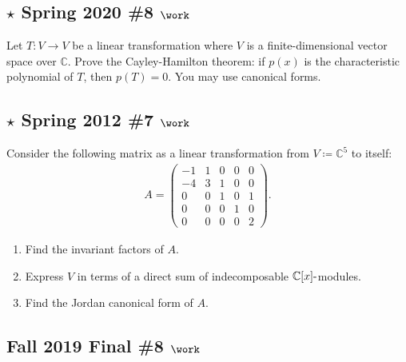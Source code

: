 \hypertarget{star-spring-2020-8-work}{%
\subsection{\texorpdfstring{\(\star\) Spring 2020 \#8
\(\work\)}{\textbackslash star Spring 2020 \#8 \textbackslash work}}\label{star-spring-2020-8-work}}

Let \(T:V\to V\) be a linear transformation where \(V\) is a
finite-dimensional vector space over \({\mathbb{C}}\). Prove the
Cayley-Hamilton theorem: if \(p(x)\) is the characteristic polynomial of
\(T\), then \(p(T) = 0\). You may use canonical forms.

\hypertarget{star-spring-2012-7-work}{%
\subsection{\texorpdfstring{\(\star\) Spring 2012 \#7
\(\work\)}{\textbackslash star Spring 2012 \#7 \textbackslash work}}\label{star-spring-2012-7-work}}

Consider the following matrix as a linear transformation from
\(V\coloneqq{\mathbb{C}}^5\) to itself:
\begin{align*}
A=\left(\begin{array}{ccccc}
-1 & 1 & 0 & 0 & 0 \\
-4 & 3 & 1 & 0 & 0 \\
0 & 0 & 1 & 0 & 1 \\
0 & 0 & 0 & 1 & 0 \\
0 & 0 & 0 & 0 & 2
\end{array}\right)
.\end{align*}

\begin{enumerate}
\def\labelenumi{\alph{enumi}.}
\item
  Find the invariant factors of \(A\).
\item
  Express \(V\) in terms of a direct sum of indecomposable
  \({\mathbb{C}}[x]{\hbox{-}}\)modules.
\item
  Find the Jordan canonical form of \(A\).
\end{enumerate}

\hypertarget{fall-2019-final-8-work}{%
\subsection{\texorpdfstring{Fall 2019 Final \#8
\(\work\)}{Fall 2019 Final \#8 \textbackslash work}}\label{fall-2019-final-8-work}}

